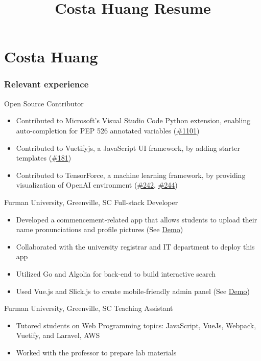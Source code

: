 \documentclass{tccv}
\title{Costa Huang Resume}
\begin{document}
\part{Costa Huang}

\section{Relevant experience}

\begin{eventlist}

     {}
     {Open Source Contributor}
\begin{itemize}
    \item Contributed to Microsoft's Visual Studio Code Python extension, enabling auto-completion for PEP 526 annotated variables (\href{https://github.com/DonJayamanne/pythonVSCode/issues/1101}{\#1101})
    \item Contributed to Vuetifyjs, a JavaScript UI  framework, by adding starter templates (\href{https://github.com/vuetifyjs/docs/pull/181}{\#181})
    \item Contributed to TensorForce, a machine learning framework, by providing visualization of \newline OpenAI environment (\href{https://github.com/reinforceio/tensorforce/pull/242}{\#242}, \href{https://github.com/reinforceio/tensorforce/pull/244}{\#244})
\end{itemize}

     {Furman University, Greenville, SC}
     {Full-stack Developer}
\begin{itemize}
    \item Developed a commencement-related app that allows students to 
upload their name pronunciations and profile pictures (See \href{https://info.costahuang.me/}{Demo})
    \item Collaborated with the university registrar and IT department to deploy this app
    \item Utilized Go and Algolia for back-end to build interactive
search
    \item Used Vue.js and Slick.js to create mobile-friendly admin panel (See \href{https://admin.costahuang.me/}{Demo})
\end{itemize}

     {Furman University, Greenville, SC}
     {Teaching Assistant}
\begin{itemize}
    \item Tutored students on Web Programming topics: JavaScript, VueJs,
Webpack, Vuetify, and Laravel, AWS
    \item Worked with the professor to prepare lab materials
\end{itemize}


\end{eventlist}
\end{document}
